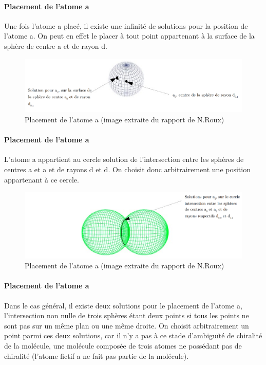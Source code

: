 \paragraph{Placement de l'atome a} Une fois l'atome a placé, il existe une infinité de solutions pour la position de l'atome a. On peut en effet le placer à tout point appartenant à la surface de la sphère de centre a et de rayon d.

\begin{figure}[!h]
	\centering
	\includegraphics[scale=0.27]{images/1_sphere.png}
	\caption{Placement de l'atome a (image extraite du rapport de N.Roux)}
\end{figure}

\paragraph{Placement de l'atome a} L'atome a appartient au cercle solution de l'intersection entre les sphères de centres a et a et de rayons d et d. On choisit donc arbitrairement une position appartenant à ce cercle.

\begin{figure}[!h]
	\centering
	\includegraphics[scale=0.3]{images/2_spheres.png}
	\caption{Placement de l'atome a (image extraite du rapport de N.Roux)}
\end{figure}


\paragraph{Placement de l'atome a} Dans le cas général, il existe deux solutions pour le placement de l'atome a, l'intersection non nulle de trois sphères étant deux points si tous les points ne sont pas sur un même plan ou une même droite. On choisit arbitrairement un point parmi ces deux solutions, car il n'y a pas à ce stade d'ambiguïté de chiralité de la molécule, une molécule composée de trois atomes ne possédant pas de chiralité (l'atome fictif a ne fait pas partie de la molécule).


